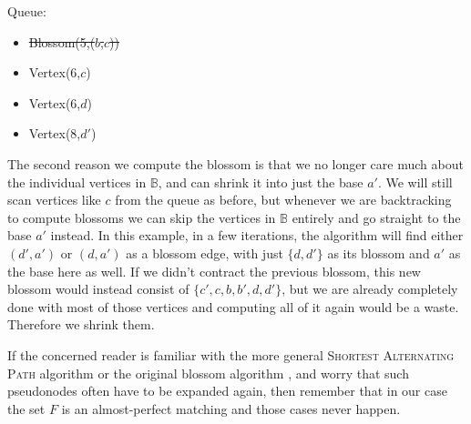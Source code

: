 \begin{minipage}{.7\linewidth}
\end{minipage}\hfill%
\begin{minipage}{.26\linewidth}
    \vspace{2cm}
    Queue:
    \begin{itemize}
        \item \st{Blossom(5,($b$,$c$))}
        \item Vertex(6,$c$)
        \item Vertex(6,$d$)
        \item Vertex(8,$d'$)
    \end{itemize}
\end{minipage}

The second reason we compute the blossom is that we no longer care much about the individual vertices in $\mathbb{B}$, and can shrink it into just the base $a'$. We will still scan vertices like $c$ from the queue as before, but whenever we are backtracking to compute blossoms we can skip the vertices in $\mathbb{B}$ entirely and go straight to the base $a'$ instead. In this example, in a few iterations, the algorithm will find either $(d',a')$ or $(d,a')$ as a blossom edge, with just $\{d,d'\}$ as its blossom and $a'$ as the base here as well. If we didn't contract the previous blossom, this new blossom would instead consist of $\{c',c,b,b',d,d'\}$, but we are already completely done with most of those vertices and computing all of it again would be a waste. Therefore we shrink them. 

If the concerned reader is familiar with the more general \textsc{Shortest Alternating Path} algorithm \cite{source:shortest_alternating_path} or the original blossom algorithm \cite{source:blossom}, and worry that such pseudonodes often have to be expanded again, then remember that in our case the set $F$ is an almost-perfect matching and those cases never happen. 

